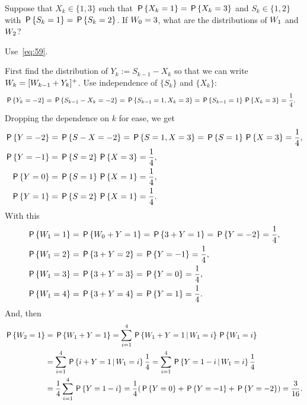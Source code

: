 \begin{exercise}\label{ex:85} 
 Suppose that $X_k\in\{1,3\}$ such that $\P{X_k=1}=\P{X_k=3}$ and
 $S_k\in\{1,2\}$ with $\P{S_k=1}=\P{S_k=2}$. If $\W_{0}=3$, what are
 the distributions of $\W_{1}$ and $\W_{2}$? 
\begin{hint}
Use~\cref{eq:59}.
\end{hint}
\begin{solution} First find the distribution of $Y_k:=S_{k-1}-X_k$ so that we can write
 $\W_{k}=[\W_{k-1}+Y_k]^+$. Use independence of $\{S_k\}$ and $\{X_k\}$:
\begin{align*}
 \P{Y_k=-2} &=\P{S_{k-1}-X_k=-2} = \P{S_{k-1}=1, X_k=3} = \P{S_{k-1}=1}\P{X_k=3} = \frac14.
\end{align*}
Dropping the dependence on $k$ for ease, we get
\begin{align*}
 \P{Y=-2} &=\P{S-X=-2} = \P{S=1, X=3} = \P{S=1}\P{X=3} = \frac14,\\
 \P{Y=-1} &=\P{S=2}\P{X=3} = \frac14,\\
 \P{Y=0} &=\P{S=1}\P{X=1} = \frac14,\\
 \P{Y=1} &=\P{S=2}\P{X=1} = \frac14.
\end{align*}
With this
 \begin{align*}
 \P{\W_{1} = 1} &=\P{\W_{0} + Y= 1} = \P{3 + Y =1} = \P{Y=-2} =\frac14,\\
 \P{\W_{1} = 2} &= \P{3 + Y =2} = \P{Y=-1} =\frac14,\\
 \P{\W_{1} = 3} &= \P{3 + Y = 3} = \P{Y=0} =\frac14,\\
 \P{\W_{1} = 4} &= \P{3 + Y = 4} = \P{Y=1} =\frac14.\\
 \end{align*}
And, then
 \begin{equation*}
 \begin{split}
 \P{\W_{2} = 1} 
&=\P{\W_{1} + Y = 1} = \sum_{i=1}^4 \P{\W_{1} + Y = 1\given \W_{1}=i}\P{\W_{1}=i}\\
&=\sum_{i=1}^4 \P{i + Y = 1\given \W_{1}=i}\frac14
=\sum_{i=1}^4 \P{Y = 1-i\given \W_{1}=i}\frac14\\
&=\frac14\sum_{i=1}^4 \P{Y = 1-i} = \frac14(\P{Y = 0} + \P{Y=-1} +\P{Y=-2}) = \frac{3}{16}.
 \end{split}
 \end{equation*}


\end{solution}
\end{exercise}



